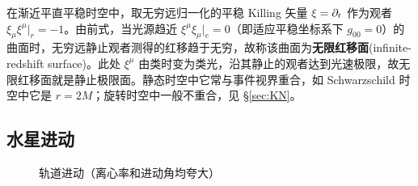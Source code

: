 在渐近平直平稳时空中，取无穷远归一化的平稳 Killing 矢量 $\xi=\partial_t$ 作为观者 $\xi_\mu\xi^\mu |_r=-1$。由前式，当光源趋近 $\xi^\mu\xi_\mu|_e=0$（即适应平稳坐标系下 $g_{00}=0$）的曲面时，无穷远静止观者测得的红移趋于无穷，故称该曲面为\textbf{无限红移面}(infinite-redshift surface)。此处 $\xi^\mu$ 由类时变为类光，沿其静止的观者达到光速极限，故无限红移面就是静止极限面。静态时空中它常与事件视界重合，如 Schwarzschild 时空中它是 $r=2M$；旋转时空中一般不重合，见 \S\ref{sec:KN}。

\subsection{水星进动}

\begin{figure}\centering
    \caption{\small 轨道进动（离心率和进动角均夸大）}
\end{figure}


